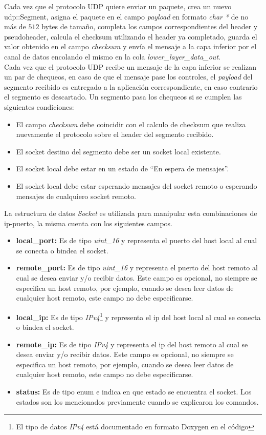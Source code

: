 \documentclass[10pt,a4paper]{article}
\begin{document}
Cada vez que el protocolo UDP quiere enviar un paquete, crea un nuevo udp::Segment, asigna el paquete en el campo \textit{payload} en formato \textit{char *} de no más de $512$ bytes de tamaño, completa los campos correspondientes del header y pseudoheader, calcula el checksum utilizando el header ya completado, guarda el valor obtenido en el campo \textit{checksum} y envía el mensaje a la capa inferior por el canal de datos encolando el mismo en la cola \textit{lower\_layer\_data\_out}. \\

Cada vez que el protocolo UDP recibe un mensaje de la capa inferior se realizan un par de chequeos, en caso de que el mensaje pase los controles, el \textit{payload} del segmento recibido es entregado a la aplicación correspondiente, en caso contrario el segmento es descartado. Un segmento pasa los chequeos si se cumplen las siguientes condiciones:

\begin{itemize}
\item El campo \textit{checksum} debe coincidir con el calculo de checksum que realiza nuevamente el protocolo sobre el header del segmento recibido.
\item El socket destino del segmento debe ser un socket local existente.
\item El socket local debe estar en un estado de ``En espera de mensajes''.
\item El socket local debe estar esperando mensajes del socket remoto o esperando mensajes de cualquiero socket remoto.
\end{itemize}

La estructura de datos \textit{Socket} es utilizada para manipular esta combinaciones de ip-puerto, la misma cuenta con los siguientes campos.

\begin{itemize}
\item \textbf{local\_port: } Es de tipo \textit{uint\_16} y representa el puerto del host local al cual se conecta o bindea el socket.
\item \textbf{remote\_port: } Es de tipo \textit{uint\_16} y representa el puerto del host remoto al cual se desea enviar y/o recibir datos. Este campo es opcional, no siempre se especifica un host remoto, por ejemplo, cuando se desea leer datos de cualquier host remoto, este campo no debe especificarse.
\item \textbf{local\_ip: } Es de tipo \textit{IPv4}\footnote{El tipo de datos \textit{IPv4} está documentado en formato Doxygen en el código} y representa el ip del host local al cual se conecta o bindea el socket.
\item \textbf{remote\_ip: } Es de tipo \textit{IPv4} y representa el ip del host remoto al cual se desea enviar y/o recibir datos. Este campo es opcional, no siempre se especifica un host remoto, por ejemplo, cuando se desea leer datos de cualquier host remoto, este campo no debe especificarse.
\item \textbf{status: } Es de tipo enum e indica en que estado se encuentra el socket. Los estados son los mencionados previamente cuando se explicaron los comandos.
\end{itemize}
\end{document}
